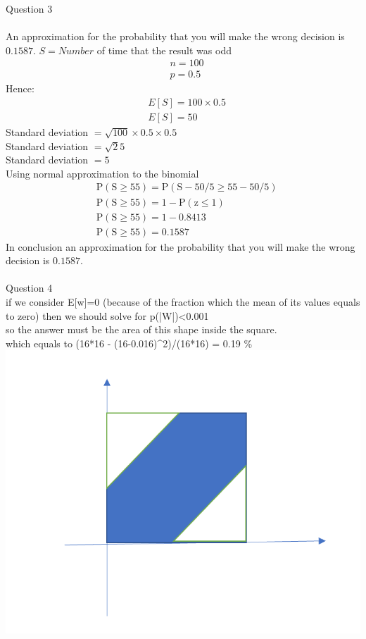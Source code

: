 \documentclass{article}
\begin{document}
Question 3\\
	\\
	An approximation for the probability that you will make the wrong decision is $0.1587 .$
$S=N u m b e r$ of time that the result was odd
$$
\begin{aligned}
&n=100 \\
&p=0.5
\end{aligned}
$$
Hence:
$$
\begin{aligned}
&E[S]=100 \times 0.5 \\
&E[S]=50
\end{aligned}
$$
Standard deviation $=\sqrt{100} \times 0.5 \times 0.5$\\
Standard deviation $=\sqrt{2} 5$\\
Standard deviation $=5$\\
Using normal approximation to the binomial\\
$$
\begin{aligned}
&\mathrm{P}(\mathrm{S} \geq 55)=\mathrm{P}(\mathrm{S}-50 / 5 \geq 55-50 / 5) \\
&\mathrm{P}(\mathrm{S} \geq 55)=1-\mathrm{P}(\mathrm{z} \leq 1) \\
&\mathrm{P}(\mathrm{S} \geq 55)=1-0.8413 \\
&\mathrm{P}(\mathrm{S} \geq 55)=0.1587
\end{aligned}
$$
In conclusion an approximation for the probability that you will make the wrong decision is $0.1587 .$\\

\\

Question 4
\\
if we consider E[w]=0 (because of the fraction which the mean of its values equals to zero) then we should solve for p(|W|)<0.001\\
so the answer must be the area of this shape inside the square.\\
which equals to  (16*16 - (16-0.016)^2)/(16*16) = 0.19 \% \\


\includegraphics{images/1.png}
\\
\end{document}
